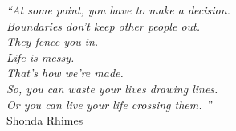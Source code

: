 \cleardoublepage
\thispagestyle{plain}

\vspace*{8cm}

\begin{flushright}
   \textsl{``At some point, you have to make a decision.\\ Boundaries don't keep other people out. \\ They fence you in. \\ Life is messy. \\ That's how we're made. \\ So, you can waste your lives drawing lines. \\ Or you can live your life crossing them. ''} \\
\vspace*{1.5cm}
           Shonda Rhimes
\end{flushright}
